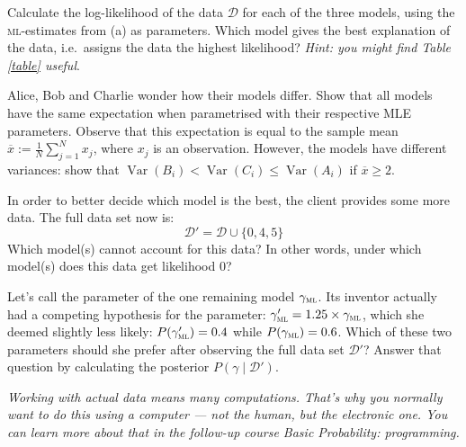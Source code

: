 \documentclass[a4paper,10pt,landscape,twocolumn]{scrartcl}
\DeclareMathOperator{\Var}{Var}
\begin{document}
\begin{exercise}
	\begin{subex}[1pt]
		Calculate the log-likelihood of the data $\mathcal D$ for each of the three models, using the \textsc{ml}-estimates from (a) as parameters. Which model gives the best explanation of the data, i.e.\ assigns the data the highest likelihood? \emph{Hint: you might find Table \ref{table} useful}.
	\end{subex}
	
	\begin{subex}[1pt]
		Alice, Bob and Charlie wonder how their models differ. Show that all models have the same expectation when parametrised with their respective MLE parameters. Observe that this expectation is equal to the sample mean $\overline x := \frac{1}{N} \sum_{j=1}^N x_j$, where $x_j$ is an observation. However, the models have different variances: show that $\Var(B_i) < \Var(C_i) \leq \Var(A_i)$ if $\overline x \ge 2$. 	\end{subex}
	
	\begin{subex}[0.5pt]
		In order to better decide which model is the best, the client provides some more data. The full
		data set now is:
		\[
			\mathcal D' = \mathcal D \cup \{ 0, 4, 5 \}
		\]
		Which model(s) cannot account for this data? In other words, under which model(s) does this data get likelihood 0?
	\end{subex}
	
	\begin{subex}[1pt]
	Let's call the parameter of the one remaining model	$\gamma_\textsc{ml}$. Its inventor actually had a competing hypothesis for the parameter: $\gamma_\textsc{ml}' = 1.25 \times \gamma_\textsc{ml}$, which she deemed slightly less likely: $P(\gamma_\textsc{ml}') = 0.4$ while $P(\gamma_\textsc{ml}) = 0.6$. Which of these two parameters should she prefer after observing the full data set $\mathcal{D'}$? Answer that question by calculating the posterior $P(\gamma \mid \mathcal{D'})$.
	\end{subex}
	
	\bigbreak\noindent
	\emph{Working with actual data means many computations. That's why you normally want to do this using a computer --- not the human, but the electronic one. You can learn more about that in the follow-up course \emph{Basic Probability: programming}.}
\end{exercise}
\end{document}
